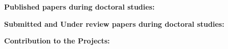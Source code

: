 \begin{publications}{99}

\item[] {{\songti{}\bf{Published papers during doctoral studies:}}}


\item[] {{\songti{}\bf{Submitted and Under review papers during doctoral studies:}}}


\item[] {{\songti{}\bf{Contribution to the Projects:}}}
\setcounter{enumiv}{0}


\end{publications}



